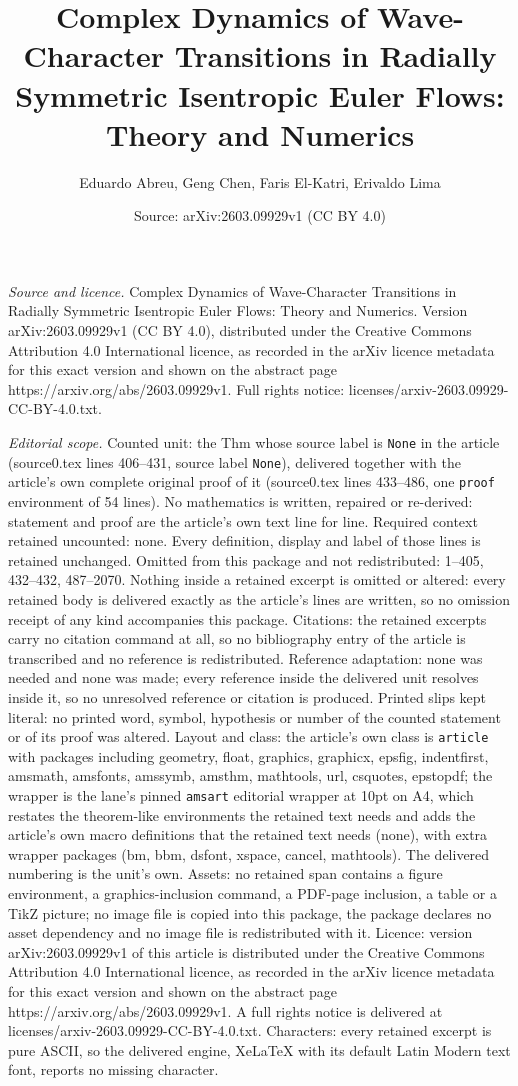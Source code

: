 \documentclass[10pt,a4paper]{amsart}
\title[Complex Dynamics of Wave-Character Transitions in Radially S]{Complex Dynamics of Wave-Character Transitions in Radially Symmetric Isentropic Euler Flows: Theory and Numerics}
\author{Eduardo Abreu, Geng Chen, Faris El-Katri, Erivaldo Lima}
\date{Source: arXiv:2603.09929v1 (CC BY 4.0)}
\begin{document}
\maketitle

\noindent\emph{Source and licence.} Complex Dynamics of Wave-Character Transitions in Radially Symmetric Isentropic Euler Flows: Theory and Numerics. Version arXiv:2603.09929v1 (CC BY 4.0), distributed under the Creative Commons Attribution 4.0 International licence, as recorded in the arXiv licence metadata for this exact version and shown on the abstract page https://arxiv.org/abs/2603.09929v1. Full rights notice: licenses/arxiv-2603.09929-CC-BY-4.0.txt.\par\smallskip

\noindent\textit{Editorial scope.} Counted unit: the Thm whose source label is \texttt{None} in the article (source0.tex lines 406--431, source label \texttt{None}), delivered together with the article's own complete original proof of it (source0.tex lines 433--486, one \texttt{proof} environment of 54 lines). No mathematics is written, repaired or re-derived: statement and proof are the article's own text line for line. Required context retained uncounted: none. Every definition, display and label of those lines is retained unchanged. Omitted from this package and not redistributed: 1--405, 432--432, 487--2070. Nothing inside a retained excerpt is omitted or altered: every retained body is delivered exactly as the article's lines are written, so no omission receipt of any kind accompanies this package. Citations: the retained excerpts carry no citation command at all, so no bibliography entry of the article is transcribed and no reference is redistributed. Reference adaptation: none was needed and none was made; every reference inside the delivered unit resolves inside it, so no unresolved reference or citation is produced. Printed slips kept literal: no printed word, symbol, hypothesis or number of the counted statement or of its proof was altered. Layout and class: the article's own class is \texttt{article} with packages including geometry, float, graphics, graphicx, epsfig, indentfirst, amsmath, amsfonts, amssymb, amsthm, mathtools, url, csquotes, epstopdf; the wrapper is the lane's pinned \texttt{amsart} editorial wrapper at 10pt on A4, which restates the theorem-like environments the retained text needs and adds the article's own macro definitions that the retained text needs (none), with extra wrapper packages (bm, bbm, dsfont, xspace, cancel, mathtools). The delivered numbering is the unit's own. Assets: no retained span contains a figure environment, a graphics-inclusion command, a PDF-page inclusion, a table or a TikZ picture; no image file is copied into this package, the package declares no asset dependency and no image file is redistributed with it. Licence: version arXiv:2603.09929v1 of this article is distributed under the Creative Commons Attribution 4.0 International licence, as recorded in the arXiv licence metadata for this exact version and shown on the abstract page https://arxiv.org/abs/2603.09929v1. A full rights notice is delivered at licenses/arxiv-2603.09929-CC-BY-4.0.txt. Characters: every retained excerpt is pure ASCII, so the delivered engine, XeLaTeX with its default Latin Modern text font, reports no missing character.
\end{document}
